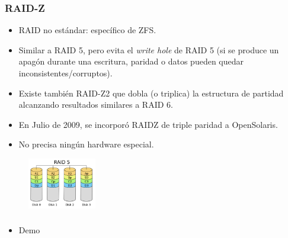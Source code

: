 \documentclass{beamer}
\begin{document}
\begin{frame}
  \frametitle{RAID-Z}

  \begin{itemize}
\small
    \item RAID no estándar: específico de ZFS.
    \item Similar a RAID 5, pero evita el \textit{write hole} de RAID 5 (si se produce un apagón durante una escritura, paridad o datos pueden quedar inconsistentes/corruptos).
    \item Existe también RAID-Z2 que dobla (o triplica) la estructura de partidad alcanzando resultados similares a RAID 6. 
    \item En Julio de 2009, se incorporó RAIDZ de triple paridad a OpenSolaris. 
    \item No precisa ningún hardware especial.
  \end{itemize}

\normalsize

\begin{figure}[h]
\begin{center}
  \includegraphics[width=3cm]{figs/RAID_5.png}
\end{center}
\end{figure}

\end{frame}


\begin{frame}
  \frametitle{}
  \begin{itemize}
    \item Demo
  \end{itemize}
\end{frame}




\end{document}
